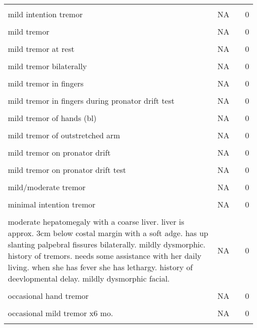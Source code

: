 \documentclass[10pt, letterpaper]{article}
\begin{document}
\begin{spacing}{1.0}
\begin{footnotesize}
\begin{longtable}[H]{p{4in}rrr}
        & & &\\[-6pt]
        mild intention tremor & NA &  & 0\\
        & & &\\[-6pt]
        mild tremor & NA &  & 0\\
        & & &\\[-6pt]
        mild tremor at rest & NA &  & 0\\
        & & &\\[-6pt]
        mild tremor bilaterally & NA &  & 0\\
        & & &\\[-6pt]
        mild tremor in fingers & NA &  & 0\\
        & & &\\[-6pt]
        mild tremor in fingers during pronator drift test & NA &  & 0\\
        & & &\\[-6pt]
        mild tremor of hands (bl) & NA &  & 0\\
        & & &\\[-6pt]
        mild tremor of outstretched arm & NA &  & 0\\
        & & &\\[-6pt]
        mild tremor on pronator drift & NA &  & 0\\
        & & &\\[-6pt]
        mild tremor on pronator drift test & NA &  & 0\\
        & & &\\[-6pt]
        mild/moderate tremor & NA &  & 0\\
        & & &\\[-6pt]
        minimal intention tremor & NA &  & 0\\
        & & &\\[-6pt]
        moderate hepatomegaly with a coarse liver. liver is approx. 3cm below costal margin with a soft adge. has up slanting palpebral fissures bilaterally. mildly dysmorphic. history of tremors. needs some assistance with her daily living. when she has fever she has lethargy. history of deevlopmental delay. mildly dysmorphic facial. & NA &  & 0\\
        & & &\\[-6pt]
        occasional hand tremor & NA &  & 0\\
        & & &\\[-6pt]
        occasional mild tremor x6 mo. & NA &  & 0\\
        & & &\\[-6pt]

\end{longtable}
\end{footnotesize}
\end{spacing}
\end{document}
